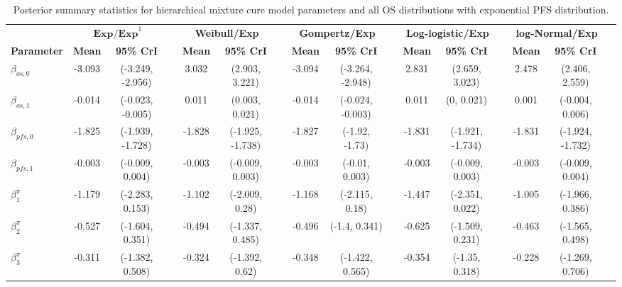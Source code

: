 \documentclass[AMA,STIX1COL]{WileyNJD-v2}
\begin{document}

\begin{landscape}
\begin{center}
\begin{table}[t]
\caption{Posterior summary statistics for hierarchical mixture cure model parameters and all OS distributions with exponential PFS distribution. \label{tab:post_hier_pfs_exp}}
\centering
\begin{tabular}{l c c c c c c c c c c c c c c c}
\toprule
\multicolumn{1}{l}{} & \multicolumn{2}{c}{$\textbf{Exp/Exp}^1$} & & \multicolumn{2}{c}{\textbf{Weibull/Exp}} & & \multicolumn{2}{c}{\textbf{Gompertz/Exp}} & & \multicolumn{2}{c}{\textbf{Log-logistic/Exp}} & & \multicolumn{2}{c}{\textbf{log-Normal/Exp}}\\
\cmidrule{2-3}\cmidrule{5-6}\cmidrule{8-9}\cmidrule{11-12}\cmidrule{14-15}
\textbf{Parameter} & \textbf{Mean} & \textbf{95\% CrI} & & \textbf{Mean} & \textbf{95\% CrI} & & \textbf{Mean} & \textbf{95\% CrI} & & \textbf{Mean} & \textbf{95\% CrI} & & \textbf{Mean} & \textbf{95\% CrI}\\
\midrule
$\beta_{os, 0}$ & -3.093 & (-3.249, -2.956) &  & 3.032 & (2.903, 3.221) &  & -3.094 & (-3.264, -2.948) &  & 2.831 & (2.659, 3.023) &  & 2.478 & (2.406, 2.559) & \\
$\beta_{os, 1}$ & -0.014 & (-0.023, -0.005) &  & 0.011 & (0.003, 0.021) &  & -0.014 & (-0.024, -0.003) &  & 0.011 & (0, 0.021) &  & 0.001 & (-0.004, 0.006) & \\
$\beta_{pfs, 0}$ & -1.825 & (-1.939, -1.728) &  & -1.828 & (-1.925, -1.738) &  & -1.827 & (-1.92, -1.73) &  & -1.831 & (-1.921, -1.734) &  & -1.831 & (-1.924, -1.732) & \\
$\beta_{pfs, 1}$ & -0.003 & (-0.009, 0.004) &  & -0.003 & (-0.009, 0.003) &  & -0.003 & (-0.01, 0.003) &  & -0.003 & (-0.009, 0.003) &  & -0.003 & (-0.009, 0.004) & \\
$\beta^{\pi}_1$ & -1.179 & (-2.283, 0.153) &  & -1.102 & (-2.009, 0.28) &  & -1.168 & (-2.115, 0.18) &  & -1.447 & (-2.351, 0.022) &  & -1.005 & (-1.966, 0.386) & \\
$\beta^{\pi}_2$ & -0.527 & (-1.604, 0.351) &  & -0.494 & (-1.337, 0.485) &  & -0.496 & (-1.4, 0.341) &  & -0.625 & (-1.509, 0.231) &  & -0.463 & (-1.565, 0.498) & \\
$\beta^{\pi}_3$ & -0.311 & (-1.382, 0.508) &  & -0.324 & (-1.392, 0.62) &  & -0.348 & (-1.422, 0.565) &  & -0.354 & (-1.35, 0.318) &  & -0.228 & (-1.269, 0.706) & \\

\end{tabular}
\end{table}
\end{center}
\end{landscape}
\end{document}
